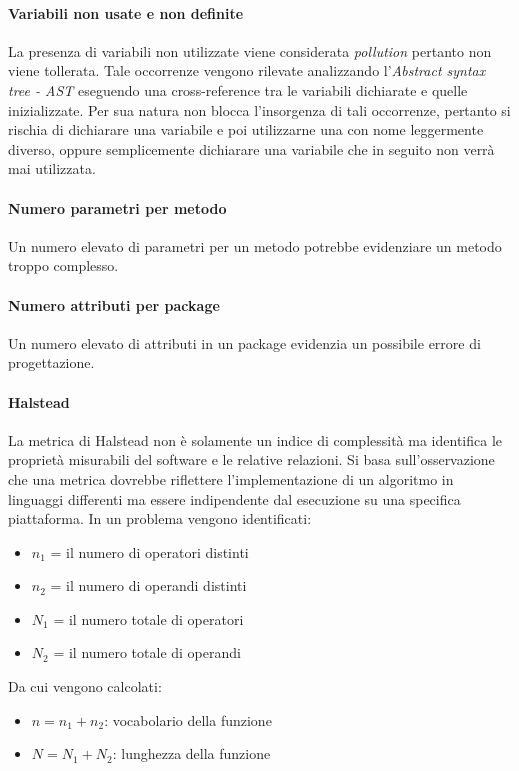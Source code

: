 			
			\paragraph{Variabili non usate e non definite}
			La presenza di variabili non utilizzate viene considerata \emph{pollution} pertanto non viene tollerata. Tale occorrenze vengono rilevate analizzando l'\emph{Abstract syntax tree - AST} eseguendo una cross-reference tra le variabili dichiarate e quelle inizializzate. Per sua natura  non blocca l'insorgenza di tali occorrenze, pertanto si rischia  di dichiarare una variabile e poi utilizzarne una con nome leggermente diverso, oppure semplicemente dichiarare una variabile che in seguito non verrà mai utilizzata.\\

			
			\paragraph{Numero parametri per metodo}
			Un numero elevato di parametri per un metodo potrebbe evidenziare un metodo troppo complesso.

			
			\paragraph{Numero attributi per package}
			Un numero elevato di attributi in un package evidenzia un possibile errore di progettazione.\\

			
			\paragraph{Halstead}
			La metrica di Halstead non è solamente un indice di complessità ma identifica le proprietà misurabili del software e le relative relazioni.
			Si basa sull'osservazione che una metrica dovrebbe riflettere l'implementazione di un algoritmo in linguaggi differenti ma essere indipendente dal esecuzione su una specifica piattaforma.
			In un problema vengono identificati:
			\begin{itemize}
				\item $n_1$ = il numero di operatori distinti
				\item $n_2$ = il numero di operandi distinti
				\item $N_1$ = il numero totale di operatori
				\item $N_2$ = il numero totale di operandi
			\end{itemize}
			Da cui vengono calcolati:
				\begin{itemize}
				\item $n = n_1 + n_2$: vocabolario della funzione
				\item $N = N_1 + N_2$: lunghezza della funzione
			\end{itemize}
			
